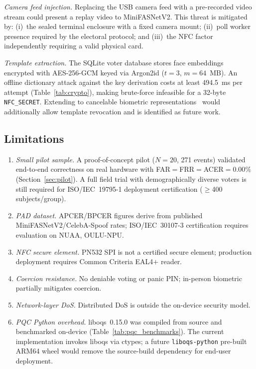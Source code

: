 \documentclass[pdflatex,sn-mathphys-num]{sn-jnl}%
\theoremstyle{thmstyleone}%
\theoremstyle{thmstyletwo}%
\theoremstyle{thmstylethree}%
\begin{document}
\textit{Camera feed injection.} Replacing the USB camera feed with a
pre-recorded video stream could present a replay video to MiniFASNetV2.
This threat is mitigated by: (i)~the sealed terminal enclosure with a fixed
camera mount; (ii)~poll worker presence required by the electoral protocol; and
(iii)~the NFC factor independently requiring a valid physical card.

\textit{Template extraction.} The SQLite voter database stores face embeddings
encrypted with AES-256-GCM keyed via Argon2id (\(t{=}3\), \(m{=}64\)~MB). An
offline dictionary attack against the key derivation costs at least 494.5~ms
per attempt (Table~\ref{tab:crypto}), making brute-force infeasible for a
32-byte \texttt{NFC\_SECRET}. Extending to cancelable biometric
representations~\cite{jain2008cancelable} would additionally allow template
revocation and is identified as future work.

\subsection{Limitations}\label{sec:limitations}

\begin{enumerate}
  \item \textit{Small pilot sample.} A proof-of-concept pilot (\(N{=}20\), 271
    events) validated end-to-end correctness on real hardware with
    FAR\(=\)FRR\(=\)ACER\(=0.00\%\) (Section~\ref{sec:pilot}). A full field
    trial with demographically diverse voters is still required for
    ISO/IEC~19795-1 deployment certification (\(\geq\)400 subjects/group).
  \item \textit{PAD dataset.} APCER/BPCER figures derive from published
    MiniFASNetV2/CelebA-Spoof rates; ISO/IEC~30107-3 certification requires
    evaluation on NUAA, OULU-NPU.
  \item \textit{NFC secure element.} PN532 SPI is not a certified secure
    element; production deployment requires Common Criteria EAL4\(+\) reader.
  \item \textit{Coercion resistance.} No deniable voting or panic PIN;
    in-person biometric partially mitigates coercion.
  \item \textit{Network-layer DoS.} Distributed DoS is outside the on-device
    security model.
  \item \textit{PQC Python overhead.} liboqs~0.15.0 was compiled from source
    and benchmarked on-device (Table~\ref{tab:pqc_benchmarks}). The current
    implementation invokes liboqs via ctypes; a future \texttt{liboqs-python}
    pre-built ARM64 wheel would remove the source-build dependency for
    end-user deployment.
\end{enumerate}
\end{document}
